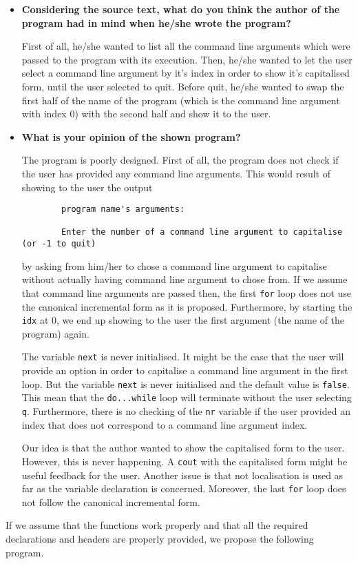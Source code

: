 \documentclass[a4paper]{article}
\newcounter{exerciseCount}
\newcommand{\exercise}[1]{\addtocounter{exerciseCount}{1} \noindent \medskip {\large \textsf{\textbf{Exercise \arabic{exerciseCount} #1}}} \par}
\begin{document}
\begin{itemize}
	\item \textbf{Considering the source text, what do you think the author of the program had in mind when he/she wrote the program?}
	
	First of all, he/she wanted to list all the command line arguments which were passed to the program with its execution. Then, he/she wanted to let the user select a command line argument by it's index in order to show it's capitalised form, until the user selected to quit. Before quit, he/she wanted to swap the first half of the name of the program (which is the command line argument with index 0) with the second half and show it to the user.
	
	\item \textbf{What is your opinion of the shown program?}
	
	The program is poorly designed. First of all, the program does not check if the user has provided any command line arguments. This would result of showing to the user the output
	
	\begin{verbatim}
		program name's arguments:
		
		Enter the number of a command line argument to capitalise (or -1 to quit)
	\end{verbatim}
	
	by asking from him/her to chose a command line argument to capitalise without actually having command line argument to chose from. If we assume that command line arguments are passed then, the first \verb|for| loop does not use the canonical incremental form as it is proposed. Furthermore, by starting the \verb|idx| at 0, we end up showing to the user the first argument (the name of the program) again.
	
	The variable \verb|next| is never initialised. It might be the case that the user will provide an option in order to capitalise a command line argument in the first loop. But the variable \verb|next| is never initialised and the default value is \verb|false|. This mean that the \verb|do...while| loop will terminate without the user selecting \verb|q|. Furthermore, there is no checking of the \verb|nr| variable if the user provided an index that does not correspond to a command line argument index.
	
	Our idea is that the author wanted to show the capitalised form to the user. However, this is never happening. A \verb|cout| with the capitalised form might be useful feedback for the user. Another issue is that not localisation is used as far as the variable declaration is concerned. Moreover, the last \verb|for| loop does not follow the canonical incremental form.
\end{itemize}

If we assume that the functions work properly and that all the required declarations and headers are properly provided, we propose the following program.



\exercise{\& 24} %


\end{document}

